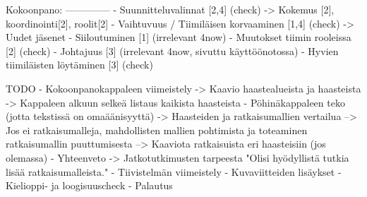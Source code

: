 Kokoonpano:
--------------
- Suunnitteluvalinnat                       [2,4] (check)
    -> Kokemus [2], koordinointi[2], roolit[2]
- Vaihtuvuus / Tiimiläisen korvaaminen      [1,4] (check)
    -> Uudet jäsenet
- Siiloutuminen                             [1] (irrelevant 4now)
- Muutokset tiimin rooleissa                [2] (check)
- Johtajuus                                 [3] (irrelevant 4now, sivuttu käyttöönotossa)
- Hyvien tiimiläisten löytäminen            [3] (check)

    TODO    
- Kokoonpanokappaleen viimeistely
-> Kaavio haastealueista ja haasteista
-> Kappaleen alkuun selkeä listaus kaikista haasteista
- Pöhinäkappaleen teko (jotta tekstissä on omaäänisyyttä)
-> Haasteiden ja ratkaisumallien vertailua
--> Jos ei ratkaisumalleja, mahdollisten mallien pohtimista ja toteaminen ratkaisumallin puuttumisesta
--> Kaaviota ratkaisuista eri haasteisiin (jos olemassa)
- Yhteenveto
-> Jatkotutkimusten tarpeesta "Olisi hyödyllistä tutkia lisää ratkaisumalleista."
- Tiivistelmän viimeistely
- Kuvaviitteiden lisäykset
- Kielioppi- ja loogisuuscheck
- Palautus
